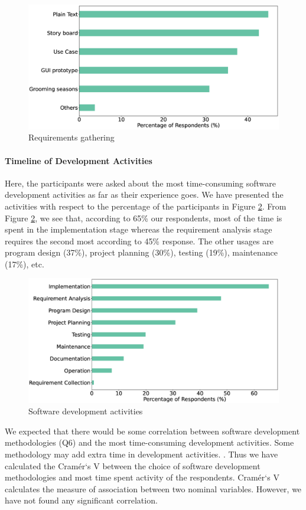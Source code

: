 \begin{figure}[h]
\centering
  \includegraphics[scale=0.18]{Figures/Requirements_Gathering}
  \caption{Requirements gathering}
  \label{fig:requirements}
\end{figure}


\paragraph{Timeline of Development Activities}
Here, the participants were asked about the most time-consuming software development activities as far as their experience goes. We have presented the activities with respect to the percentage of the participants in Figure \ref{fig:activities}. From Figure \ref{fig:activities}, we see that, according to 65\% our respondents, most of the time is spent in the implementation stage whereas the requirement analysis stage requires the second most according to 45\% response. The other usages are program design (37\%), project planning (30\%), testing (19\%), maintenance (17\%), etc.

\begin{figure}[h]
\centering
  \includegraphics[scale=0.2]{Figures/Respondents_Activities}
  \caption{Software development activities}
  \label{fig:activities}
\end{figure}
We expected that there would be some correlation between software development methodologies (Q6) and the most time-consuming development activities. Some methodology may add extra time in development activities. . Thus we have calculated the Cramér`s V \cite{Cramer1946} between the choice of software development methodologies and most time spent activity of the respondents. Cramér`s V calculates the measure of association between two nominal variables\cite{Sheskin2007}. However, we have not found any significant correlation.

